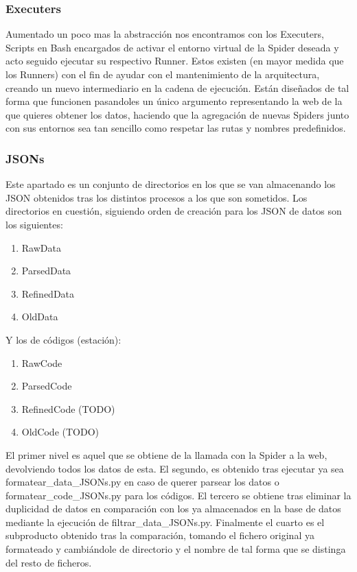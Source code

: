\subsubsection{Executers}
Aumentado un poco mas la abstracción nos encontramos con los Executers, Scripts en Bash encargados de activar el entorno virtual de la Spider deseada y acto seguido ejecutar su respectivo Runner.
Estos existen (en mayor medida que los Runners) con el fin de ayudar con el mantenimiento de la arquitectura, creando un nuevo intermediario en la cadena de ejecución.\newline
Están diseñados de tal forma que funcionen pasandoles un único argumento representando la web de la que quieres obtener los datos, haciendo que la agregación de nuevas Spiders junto con sus entornos sea tan sencillo como respetar las rutas y nombres predefinidos.

\subsubsection{JSONs}
Este apartado es un conjunto de directorios en los que se van almacenando los JSON obtenidos tras los distintos procesos a los que son sometidos.\newline
Los directorios en cuestión, siguiendo orden de creación para los JSON de datos son los siguientes:
\begin{enumerate}
	\item RawData
	\item ParsedData
	\item RefinedData
	\item OldData
\end{enumerate}
Y los de códigos (estación):
\begin{enumerate}
	\item RawCode
	\item ParsedCode
	\item RefinedCode (TODO)
	\item OldCode (TODO)
\end{enumerate}
El primer nivel es aquel que se obtiene de la llamada con la Spider a la web, devolviendo todos los datos de esta.\newline
El segundo, es obtenido tras ejecutar ya sea formatear\_data\_JSONs.py en caso de querer parsear los datos o formatear\_code\_JSONs.py para los códigos.\newline
El tercero se obtiene tras eliminar la duplicidad de datos en comparación con los ya almacenados en la base de datos mediante la ejecución de filtrar\_data\_JSONs.py.\newline
Finalmente el cuarto es el subproducto obtenido tras la comparación, tomando el fichero original ya formateado y cambiándole de directorio y el nombre de tal forma que se distinga del resto de ficheros.\newline

